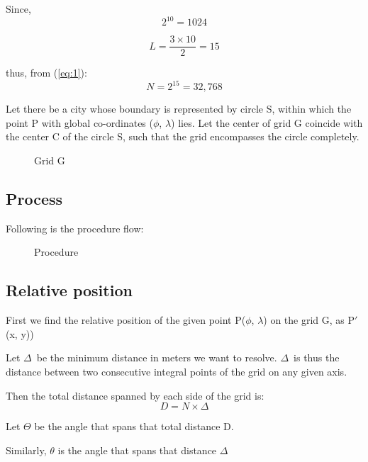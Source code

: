 \documentclass[conference]{IEEEtran}
\begin{document}
Since, \begin{equation}
2^{10} = 1024
\end{equation}

\begin{equation}
L = \frac{3 \times 10}{2} = 15
\end{equation}

thus, from (\ref{eq:1}):
\begin{equation}
\label{eq:4} N = 2^{15} = 32{,}768
\end{equation}

Let there be a city whose boundary is represented by circle S, within which the point P with global co-ordinates ($\phi$, $\lambda$) lies. Let the center of grid G coincide with the center C of the circle S, such that the grid encompasses the circle completely.

\begin{figure}[H]
\centerline{}
\caption{Grid G}
\label{Grid}
\end{figure}

\clearpage
\subsection{Process} Following is the procedure flow:

\begin{figure}[H]
\centerline{}
\caption{Procedure}
\label{Procedure}
\end{figure}

\subsection{Relative position} First we find the relative position of the given point P($\phi$, $\lambda$) on the grid G, as P$'$(x, y))

Let $\Delta$\ be the minimum distance in meters we want to resolve.
$\Delta$\ is thus the distance between two consecutive integral points of the grid on any given axis.

Then the total distance spanned by each side of the grid is:
\begin{equation}
D = N \times \Delta
\end{equation}

Let $\Theta$ be the angle that spans that total distance D.

Similarly, $\theta$ is the angle that spans that distance $\Delta$
\end{document}
